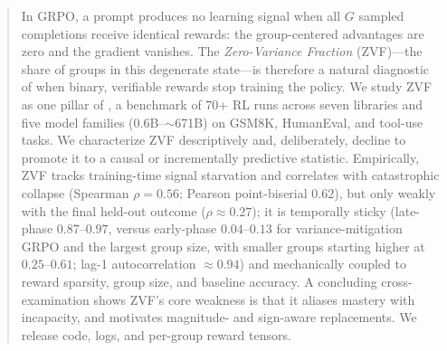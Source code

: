 \begin{abstract}
In GRPO, a prompt produces no learning signal when all $G$ sampled completions
receive identical rewards: the group-centered advantages are zero and the gradient
vanishes. The \emph{Zero-Variance Fraction} (ZVF)---the share of groups in this
degenerate state---is therefore a natural diagnostic of when binary, verifiable
rewards stop training the policy. We study ZVF as one pillar of \ours{}, a
benchmark of 70+ RL runs across seven libraries and five model families
($0.6$B--$\sim$671B) on GSM8K, HumanEval, and tool-use tasks. We characterize ZVF
descriptively and, deliberately, decline to promote it to a causal or
incrementally predictive statistic. Empirically, ZVF tracks training-time signal
starvation and correlates with catastrophic collapse (Spearman
$\rho = 0.56$; Pearson point-biserial $0.62$), but only weakly with the final held-out outcome
($\rho \approx 0.27$); it is temporally sticky (late-phase $0.87$--$0.97$, versus
early-phase $0.04$--$0.13$ for variance-mitigation GRPO and the largest group size,
with smaller groups starting higher at $0.25$--$0.61$; lag-1 autocorrelation $\approx 0.94$) and mechanically
coupled to reward sparsity, group size, and baseline accuracy. A concluding
cross-examination shows ZVF's core weakness is that it aliases mastery with
incapacity, and motivates magnitude- and sign-aware replacements. We release code,
logs, and per-group reward tensors.
\end{abstract}
